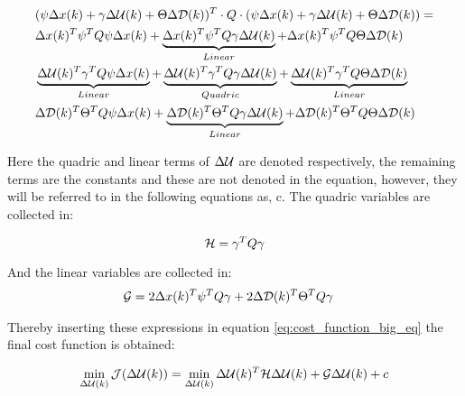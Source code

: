 \begin{equation}\label{eq:cost_function_big_eq}
	\begin{aligned}
	&(\psi\Delta x(k) + \gamma\Delta \CMcal{U}(k) + \Theta\Delta \CMcal{D}(k))^T\cdot Q \cdot (\psi\Delta x(k) + \gamma\Delta \CMcal{U}(k) + \Theta\Delta \CMcal{D}(k)) = \\
	& \Delta x(k)^T\psi ^T Q \psi \Delta x(k) 								+ \underbrace{\Delta x(k)^T \psi ^T Q \gamma \Delta  \CMcal{U}(k) }_{Linear}				+\Delta x(k)^T \psi ^T Q \Theta \Delta \CMcal{D}(k) \\
	& \underbrace{\Delta \CMcal{U}(k)^T \gamma ^T Q \psi\Delta x(k)}_{Linear} + \underbrace{\Delta \CMcal{U}(k)^T\gamma ^T Q \gamma\Delta \CMcal{U}(k)}_{Quadric} +\underbrace{\Delta \CMcal{U}(k)^T \gamma ^T Q\Theta \Delta \CMcal{D}(k)}_{Linear} \\ 
	& \Delta \CMcal{D}(k)^T \Theta ^T Q  \psi \Delta x(k)					+ \underbrace{\Delta \CMcal{D}(k)^T \Theta ^T Q \gamma  \Delta \CMcal{U}(k) }_{Linear}	+\Delta \CMcal{D}(k)^T \Theta ^T Q \Theta \Delta \CMcal{D}(k)
	\end{aligned}
\end{equation}

Here the quadric and linear terms of $\Delta \CMcal{U}$ are denoted respectively, the remaining terms are the constants and these are not denoted in the equation, however, they will be referred to in the following equations as, c. The quadric variables are collected in: 

\begin{equation}
	\CMcal{H} = \gamma^T Q\gamma 
\end{equation}

And the linear variables are collected in:
\begin{equation}
	\begin{aligned}
	\CMcal{G} &= 2 \Delta x(k)^T\psi^T Q \gamma+2 \Delta \CMcal{D}(k)^T\Theta^T Q \gamma 
	\end{aligned}
\end{equation}

Thereby inserting these expressions in equation \ref{eq:cost_function_big_eq} the final cost function is obtained:

\begin{equation}\label{eq:the_cost_function}
	\min_{\Delta \CMcal{U}(k)} \CMcal{J}(\Delta \CMcal{U}(k)) =\min_{\Delta \CMcal{U}(k)} \Delta \CMcal{U}(k)^T\CMcal{H}\Delta \CMcal{U}(k)+\CMcal{G}\Delta \CMcal{U}(k)+c
\end{equation}

